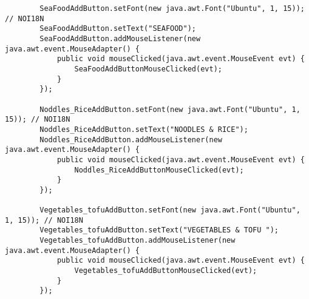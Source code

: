\documentclass[12pt,a4paper]{article}
\begin{document}
\begin{lstlisting}
        SeaFoodAddButton.setFont(new java.awt.Font("Ubuntu", 1, 15)); // NOI18N
        SeaFoodAddButton.setText("SEAFOOD");
        SeaFoodAddButton.addMouseListener(new java.awt.event.MouseAdapter() {
            public void mouseClicked(java.awt.event.MouseEvent evt) {
                SeaFoodAddButtonMouseClicked(evt);
            }
        });

        Noddles_RiceAddButton.setFont(new java.awt.Font("Ubuntu", 1, 15)); // NOI18N
        Noddles_RiceAddButton.setText("NOODLES & RICE");
        Noddles_RiceAddButton.addMouseListener(new java.awt.event.MouseAdapter() {
            public void mouseClicked(java.awt.event.MouseEvent evt) {
                Noddles_RiceAddButtonMouseClicked(evt);
            }
        });

        Vegetables_tofuAddButton.setFont(new java.awt.Font("Ubuntu", 1, 15)); // NOI18N
        Vegetables_tofuAddButton.setText("VEGETABLES & TOFU ");
        Vegetables_tofuAddButton.addMouseListener(new java.awt.event.MouseAdapter() {
            public void mouseClicked(java.awt.event.MouseEvent evt) {
                Vegetables_tofuAddButtonMouseClicked(evt);
            }
        });


\end{lstlisting}
\end{document}

